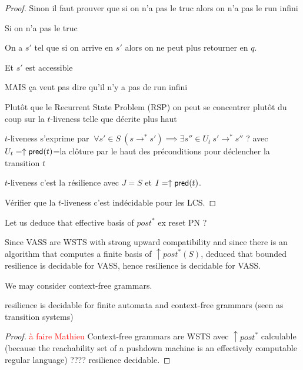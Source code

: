 \begin{proof}
{Sinon il faut prouver que si on n'a pas le truc alors on n'a pas le run infini

Si on n'a pas le truc

On a $s'$ tel que si on arrive en $s'$ alors on ne peut plus retourner en $q$.

Et $s'$ est accessible

MAIS ça veut pas dire qu’il n’y a pas de run infini

Plutôt que le Recurrent State Problem (RSP) on peut se concentrer plutôt du coup sur la $t$-liveness telle que décrite plus haut

$t$-liveness s'exprime par $ ~ \forall s' \in S ~ (s \rightarrow^* s') \implies \exists s'' \in U_t ~ s' \rightarrow^{*} s''$ ? avec $U_t=\uparrow \textsf{pred}(t)$=la clôture par le haut des préconditions pour déclencher la transition $t$

$t$-liveness c'est la résilience avec $J=S$ et $I = \uparrow \textsf{pred}(t)$.

Vérifier que la $t$-liveness c'est indécidable pour les LCS.
}

\end{proof}

Let us deduce that effective basis of $post^*$ ex reset PN ?

Since VASS are WSTS with strong upward compatibility and since there is an algorithm that computes a finite basis of  $\uparrow post^*(S)$, \cite{DBLP:conf/gg/Ozkan22} deduced that bounded resilience is decidable for VASS, hence resilience is decidable for VASS. 

We may consider context-free grammars.

\begin{corollary}
{\sc resilience} is decidable for finite automata and context-free grammars (seen as transition systems)
\end{corollary}

\begin{proof}

  \textcolor{red}{à faire Mathieu}
Context-free grammars are WSTS \cite{DBLP:journals/tcs/FinkelS01} avec $\uparrow post^*$ calculable (because the reachability set of a pushdown machine is an effectively computable regular language) ???? resilience decidable.
\end{proof}


\cite{DBLP:journals/ipl/BouajjaniEFMRWW00}



